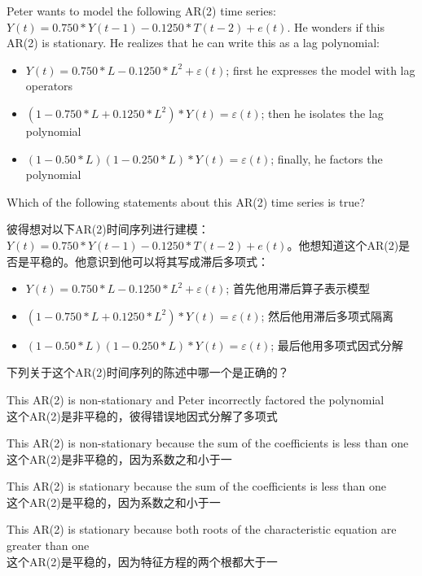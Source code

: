 \documentclass{article}
\newcounter{question} %
\begin{document}
\begin{question}
    Peter wants to model the following AR(2) time series: $Y(t) = 0.750*Y(t-1) - 0.1250*T(t-2) + e(t)$. He wonders if this AR(2) is stationary. He realizes that he can write this as a lag polynomial:
    \begin{itemize}
        \item $Y(t) = 0.750*L - 0.1250*L^2 + \varepsilon(t)$; first he expresses the model with lag operators
        \item $(1 - 0.750*L + 0.1250*L^2)*Y(t) = \varepsilon(t)$; then he isolates the lag polynomial
        \item $(1 - 0.50*L)(1 - 0.250*L)*Y(t) = \varepsilon(t)$; finally, he factors the polynomial
    \end{itemize}
    Which of the following statements about this AR(2) time series is true?

    彼得想对以下AR(2)时间序列进行建模：$Y(t) = 0.750*Y(t-1) - 0.1250*T(t-2) + e(t)$。他想知道这个AR(2)是否是平稳的。他意识到他可以将其写成滞后多项式：
    \begin{itemize}
        \item $Y(t) = 0.750*L - 0.1250*L^2 + \varepsilon(t)$; 首先他用滞后算子表示模型
        \item $(1 - 0.750*L + 0.1250*L^2)*Y(t) = \varepsilon(t)$; 然后他用滞后多项式隔离
        \item $(1 - 0.50*L)(1 - 0.250*L)*Y(t) = \varepsilon(t)$; 最后他用多项式因式分解
    \end{itemize}
    下列关于这个AR(2)时间序列的陈述中哪一个是正确的？
\end{question}

\begin{choices}
    \item This AR(2) is non-stationary and Peter incorrectly factored the polynomial
    \\这个AR(2)是非平稳的，彼得错误地因式分解了多项式
    \item This AR(2) is non-stationary because the sum of the coefficients is less than one
    \\这个AR(2)是非平稳的，因为系数之和小于一
    \item This AR(2) is stationary because the sum of the coefficients is less than one
    \\这个AR(2)是平稳的，因为系数之和小于一
    \item This AR(2) is stationary because both roots of the characteristic equation are greater than one
    \\这个AR(2)是平稳的，因为特征方程的两个根都大于一
\end{choices}
\end{document}
